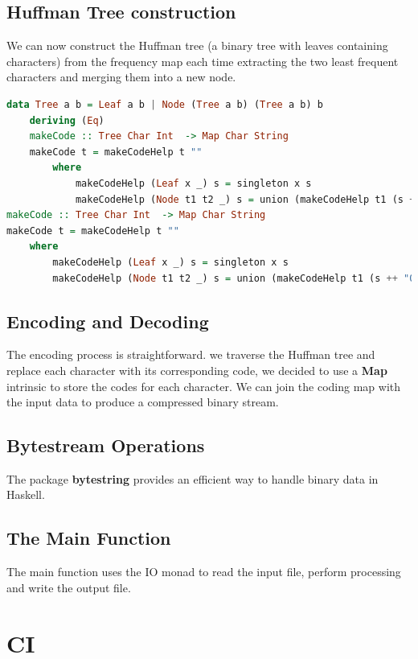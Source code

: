 \documentclass{article}
\begin{document}
\subsection{Huffman Tree construction}

We can now construct the Huffman tree (a binary tree with leaves containing characters) from the frequency map
each time extracting the two least frequent characters and merging them into a new node.

\begin{lstlisting}[language=Haskell, caption={Huffman tree construction.}]
data Tree a b = Leaf a b | Node (Tree a b) (Tree a b) b
    deriving (Eq)
    makeCode :: Tree Char Int  -> Map Char String
    makeCode t = makeCodeHelp t ""
        where
            makeCodeHelp (Leaf x _) s = singleton x s
            makeCodeHelp (Node t1 t2 _) s = union (makeCodeHelp t1 (s ++ "0")) (makeCodeHelp t2 (s ++ "1"))
makeCode :: Tree Char Int  -> Map Char String
makeCode t = makeCodeHelp t ""
    where
        makeCodeHelp (Leaf x _) s = singleton x s
        makeCodeHelp (Node t1 t2 _) s = union (makeCodeHelp t1 (s ++ "0")) (makeCodeHelp t2 (s ++ "1"))
\end{lstlisting}

\subsection{Encoding and Decoding}

The encoding process is straightforward. we traverse the Huffman tree and replace each character with its corresponding code,
we decided to use a \textbf{Map} intrinsic to store the codes for each character. 
We can join the coding map with the input data to produce a compressed binary stream.

\subsection{Bytestream Operations}

The package \textbf{bytestring} provides an efficient way to handle binary data in Haskell.

\subsection{The Main Function}

The main function uses the IO monad to read the input file, perform processing and write the output file.

\section{CI}
\end{document}
